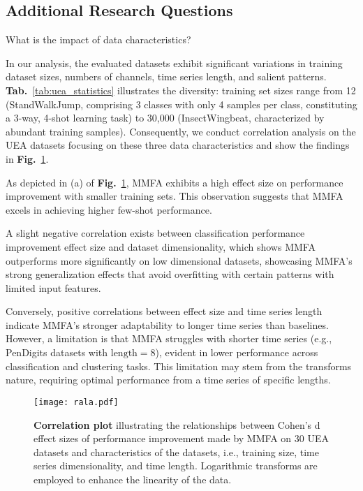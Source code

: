 \subsection{Additional Research Questions}\label{sec:additional_RQs}






\begin{researchq}
What is the impact of data characteristics?
\end{researchq}

In our analysis, the evaluated datasets exhibit significant variations in training dataset sizes, numbers of channels, time series length, and salient patterns. \textbf{Tab.}~\ref{tab:uea_statistics} illustrates the diversity: training set sizes range from 12 (StandWalkJump, comprising 3 classes with only 4 samples per class, constituting a 3-way, 4-shot learning task) to 30,000 (InsectWingbeat, characterized by abundant training samples). Consequently, we conduct correlation analysis on the UEA datasets focusing on these three data characteristics and show the findings in \textbf{Fig.}~\ref{fig:data_char}.

As depicted in (a) of \textbf{Fig.}~\ref{fig:data_char}, MMFA exhibits a high effect size on performance improvement with smaller training sets. This observation suggests that MMFA excels in achieving higher few-shot performance.

A slight negative correlation exists between classification performance improvement effect size and dataset dimensionality, which shows MMFA outperforms more significantly on low dimensional datasets, showcasing MMFA's strong generalization effects that avoid overfitting with certain patterns with limited input features.

Conversely, positive correlations between effect size and time series length indicate MMFA's stronger adaptability to longer time series than baselines. However, a limitation is that MMFA struggles with shorter time series (e.g., PenDigits datasets with $\text{length} = 8$), evident in lower performance across classification and clustering tasks. This limitation may stem from the transforms nature, requiring optimal performance from a time series of specific lengths.

\begin{figure}
    \centering
    \texttt{[image: rala.pdf]}
    \caption{\textbf{Correlation plot} illustrating the relationships between Cohen's d effect sizes of performance improvement made by MMFA on 30 UEA datasets and characteristics of the datasets, i.e., training size, time series dimensionality, and time length. Logarithmic transforms are employed to enhance the linearity of the data.}
    \label{fig:data_char}
\end{figure}


